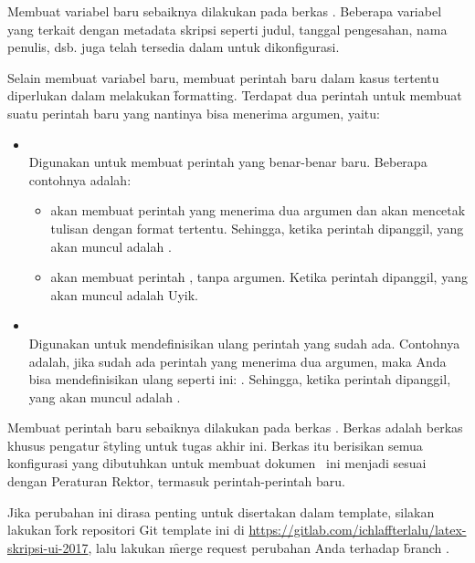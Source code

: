 Membuat variabel baru sebaiknya dilakukan pada berkas .
Beberapa variabel yang terkait dengan metadata skripsi seperti judul, tanggal pengesahan, nama penulis, dsb. juga telah tersedia dalam  untuk dikonfigurasi.

Selain membuat variabel baru, membuat perintah baru dalam kasus tertentu diperlukan dalam melakukan \f{formatting}.
Terdapat dua perintah untuk membuat suatu perintah baru yang nantinya bisa menerima argumen, yaitu:
\begin{itemize}
	\item {} \\
	Digunakan untuk membuat perintah yang benar-benar baru. Beberapa contohnya adalah:
	\begin{itemize}
		\item {} akan membuat perintah  yang menerima dua argumen dan akan mencetak tulisan dengan format tertentu.
		Sehingga, ketika perintah  dipanggil, yang akan muncul adalah .
		\item {} akan membuat perintah , tanpa argumen.
		Ketika perintah  dipanggil, yang akan muncul adalah Uyik.
	\end{itemize}
	\item {} \\
	Digunakan untuk mendefinisikan ulang perintah yang sudah ada.
	Contohnya adalah, jika sudah ada perintah  yang menerima dua argumen, maka Anda bisa mendefinisikan ulang seperti ini: .
	Sehingga, ketika perintah  dipanggil, yang akan muncul adalah .
\end{itemize}

Membuat perintah baru sebaiknya dilakukan pada berkas .
Berkas  adalah berkas khusus pengatur \f{styling} untuk tugas akhir ini.
Berkas itu berisikan semua konfigurasi yang dibutuhkan untuk membuat dokumen \latex~ini menjadi sesuai dengan Peraturan Rektor, termasuk perintah-perintah baru.

Jika perubahan ini dirasa penting untuk disertakan dalam template, silakan lakukan \f{fork} repositori Git template ini di \url{https://gitlab.com/ichlaffterlalu/latex-skripsi-ui-2017}, lalu lakukan \f{merge request} perubahan Anda terhadap \f{branch} .


